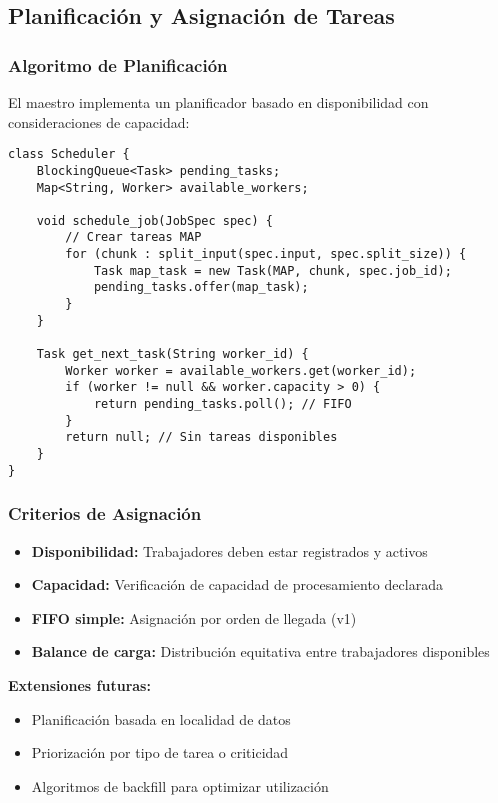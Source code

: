 \subsection{Planificación y Asignación de Tareas}

\subsubsection{Algoritmo de Planificación}

El maestro implementa un planificador basado en disponibilidad con consideraciones de capacidad:

\begin{verbatim}
class Scheduler {
    BlockingQueue<Task> pending_tasks;
    Map<String, Worker> available_workers;
    
    void schedule_job(JobSpec spec) {
        // Crear tareas MAP
        for (chunk : split_input(spec.input, spec.split_size)) {
            Task map_task = new Task(MAP, chunk, spec.job_id);
            pending_tasks.offer(map_task);
        }
    }
    
    Task get_next_task(String worker_id) {
        Worker worker = available_workers.get(worker_id);
        if (worker != null && worker.capacity > 0) {
            return pending_tasks.poll(); // FIFO
        }
        return null; // Sin tareas disponibles
    }
}
\end{verbatim}

\subsubsection{Criterios de Asignación}

\begin{itemize}
    \item \textbf{Disponibilidad:} Trabajadores deben estar registrados y activos
    \item \textbf{Capacidad:} Verificación de capacidad de procesamiento declarada
    \item \textbf{FIFO simple:} Asignación por orden de llegada (v1)
    \item \textbf{Balance de carga:} Distribución equitativa entre trabajadores disponibles
\end{itemize}

\textbf{Extensiones futuras:}
\begin{itemize}
    \item Planificación basada en localidad de datos
    \item Priorización por tipo de tarea o criticidad
    \item Algoritmos de backfill para optimizar utilización
\end{itemize}

